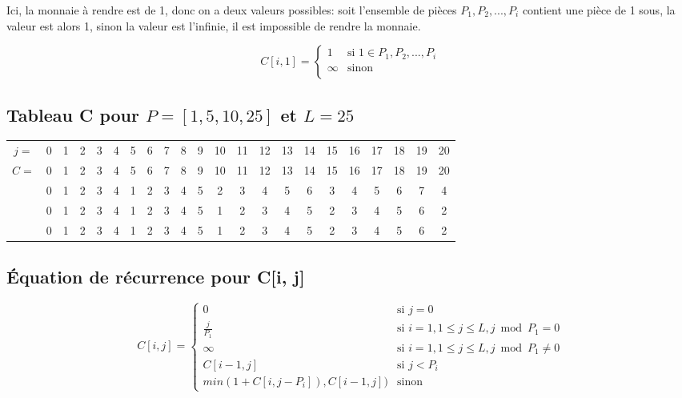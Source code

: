 \documentclass[10.9pt]{article} %
\begin{document}
Ici, la monnaie à rendre est de 1, donc on a deux valeurs possibles: soit l'ensemble de pièces
$P_1, P_2, ... , P_i$ contient une pièce de 1 sous, la valeur est alors 1, sinon la valeur est
l'infinie, il est impossible de rendre la monnaie.

\begin{equation}
C[i,1] = 
\begin{cases}
 1  &\text{si }  1 \in P_1, P_2, ... , P_i \\
 \infty                   &\text{sinon}\\
\end{cases}
\end{equation}

\subsection{Tableau C pour $P = [1, 5, 10, 25]$ et $L = 25$}
\begin{tabular}{c|c|c|c|c|c|c|c|c|c|c|c|c|c|c|c|c|c|c|c|c|c|}
\cline{2-22}
 $j=$&  0 & 1 & 2 & 3 & 4 & 5 & 6 & 7 & 8 & 9 & 10 & 11 & 12 & 13 &14 & 15 & 16 & 17 & 18 & 19 & 20 \\ \cline{2-22}
\multirow{4}{*}{$C=$} & 0 & 1 & 2 & 3 & 4 & 5 & 6 & 7 & 8 & 9 & 10 & 11 & 12 & 13 &14 & 15 & 16 & 17 & 18 & 19 & 20 \\ \cline{2-22}
 & 0 & 1 & 2 & 3 & 4 & 1 & 2 & 3 & 4 & 5 & 2 & 3 & 4 & 5 & 6 & 3 & 4 & 5 & 6 & 7 & 4 \\ \cline{2-22}
 & 0 & 1 & 2 & 3 & 4 & 1 & 2 & 3 & 4 & 5 & 1 & 2 & 3 & 4 & 5 & 2 & 3 & 4 & 5 & 6 & 2 \\ \cline{2-22}
 & 0 & 1 & 2 & 3 & 4 & 1 & 2 & 3 & 4 & 5 & 1 & 2 & 3 & 4 & 5 & 2 & 3 & 4 & 5 & 6 & 2 \\ \cline{2-22}
\end{tabular}

\subsection{Équation de récurrence pour C[i, j]}

\begin{equation}
 C[i, j] = 
 \begin{cases}
  0 			&\text{si } j = 0 \\
  \frac{j}{P_1} 	&\text{si } i = 1, 1 \le j \le L, j \bmod P_1 = 0 \\
  \infty 		&\text{si } i = 1, 1 \le j \le L, j \bmod P_1 \neq 0 \\
  C[i-1, j]		&\text{si } j < P_i \\
  min(1 + C[i, j - P_i]), C[i-1, j])	&\text{sinon}
 \end{cases}
\end{equation}
\end{document}
